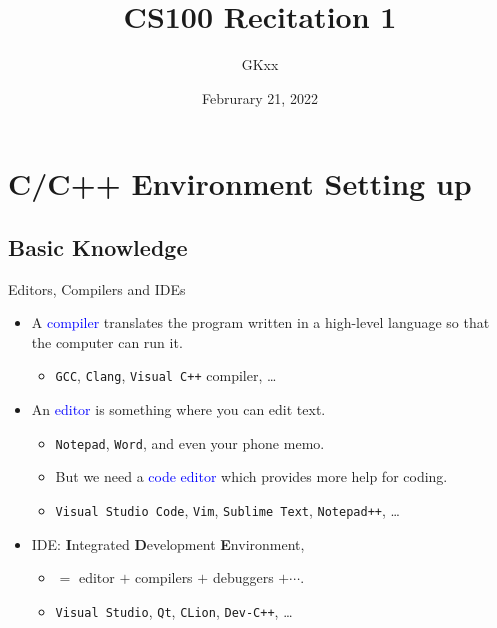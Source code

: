 \documentclass[handout]{beamer}
\title{CS100 Recitation 1}
\author{GKxx}
\date{Februrary 21, 2022}
\newcommand{\blue}[1]{\textcolor{blue}{#1}}
\begin{document}
\begin{frame}
    \titlepage
\end{frame}


\section{C/C++ Environment Setting up}

\subsection{Basic Knowledge}

\begin{frame}{Editors, Compilers and IDEs}
    \begin{itemize}
        \item A \blue{compiler} translates the program written in a high-level language so that the computer can run it.
        \begin{itemize}
            \item \texttt{GCC}, \texttt{Clang}, \texttt{Visual C++} compiler, \dots
        \end{itemize}
        \pause
        \item An \blue{editor} is something where you can edit text.
        \begin{itemize}
            \item \texttt{Notepad}, \texttt{Word}, and even your phone memo.
            \pause
            \item But we need a \blue{code editor} which provides more help for coding.
            \item \texttt{Visual Studio Code}, \texttt{Vim}, \texttt{Sublime Text}, \texttt{Notepad++}, \dots
        \end{itemize}
        \pause
        \item IDE: \textbf{I}ntegrated \textbf{D}evelopment \textbf{E}nvironment,
        \begin{itemize}
            \item \(=\) editor \(+\) compilers \(+\) debuggers \(+\cdots\).
            \item \texttt{Visual Studio}, \texttt{Qt}, \texttt{CLion}, \texttt{Dev-C++}, \dots
        \end{itemize}
    \end{itemize}
\end{frame}
\end{document}
